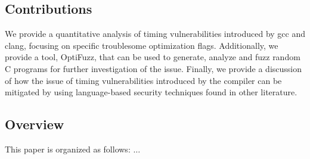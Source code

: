 \subsection{Contributions}
We provide a quantitative analysis of timing vulnerabilities introduced by gcc and clang, focusing on specific troublesome optimization flags.
Additionally, we provide a tool, OptiFuzz, that can be used to generate, analyze and fuzz random C programs for further investigation of the issue.
Finally, we provide a discussion of how the issue of timing vulnerabilities introduced by the compiler can be mitigated by using language-based security techniques found in other literature.
\subsection{Overview}
This paper is organized as follows: $\ldots$ 
